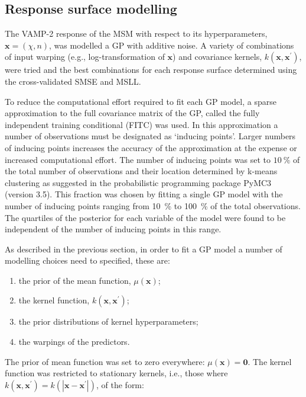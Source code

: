 \subsection{Response surface modelling}\label{subsec:rsm}
The VAMP-2 response of the MSM with respect to its hyperparameters, $\mathbf{x} = (\chi, n)$, was modelled a GP with additive noise. A variety of combinations of input warping (e.g., log-transformation of $\mathbf{x}$) and covariance kernels, $k(\mathbf{x}, \mathbf{x}^{\prime})$,  were tried and the best combinations for each response surface determined using the cross-validated SMSE and MSLL. 

To reduce the computational effort required to fit each GP model, a sparse approximation to the full covariance matrix of the GP, called the fully independent training conditional (FITC) was used.\cite{quinonero-candelaUnifyingViewSparse2005} In this approximation a number of observations must be designated as `inducing points'. Larger numbers of inducing points increases the accuracy of the approximation at the expense or increased computational effort. The number of inducing points was set to $\SI{10}{\percent}$ of the total number of observations and their location determined by k-means clustering as suggested in the probabilistic programming package PyMC3 (version 3.5).\cite{salvatierProbabilisticProgrammingPython2016} This fraction was chosen by fitting a single GP model with the number of inducing points ranging from \SI{10}{\percent} to \SI{100}{\percent} of the total observations. The quartiles of the posterior for each variable of the model were found to be independent of the number of inducing points in this range.  

As described in the previous section, in order to fit a GP model a number of modelling choices need to specified, these are: 
\begin{enumerate}
    \item the prior of the mean function, $\mu(\mathbf{x})$;
    \item the kernel function, $k(\mathbf{x}, \mathbf{x}^{\prime})$;
    \item the prior distributions of kernel hyperparameters;
    \item the warpings of the predictors.
\end{enumerate}

The prior of mean function  was set to zero everywhere: $\mu(\mathbf{x})=\mathbf{0}$. The kernel function was restricted to stationary kernels, i.e., those where $k(\mathbf{x}, \mathbf{x}^{\prime}) = k(|\mathbf{x} - \mathbf{x}^{\prime}|)$, of the form: 

